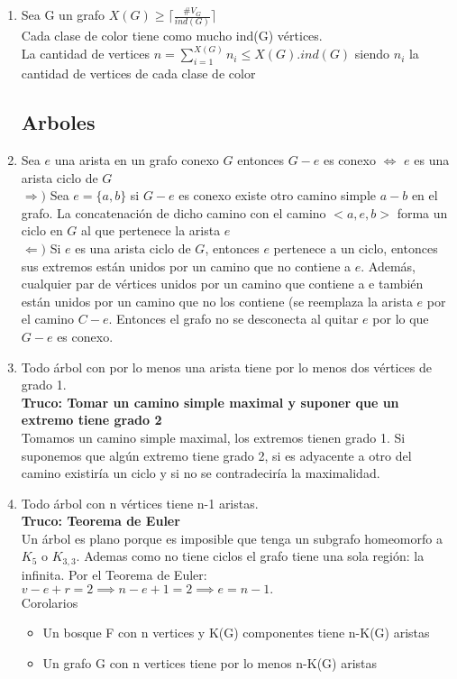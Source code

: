 \documentclass{article}
\begin{document}
\begin{enumerate}
    \item Sea G un grafo $X(G) \geq \lceil\frac{\#V_G}{ind(G)}\rceil$ \\
    Cada clase de color tiene como mucho ind(G) vértices.\\
    La cantidad de vertices $n=\sum_{i=1}^{X(G)}n_i\leq X(G).ind(G)$ siendo $n_i$ la cantidad de vertices de cada clase de color

\subsection{Arboles}
    \item Sea $e$ una arista en un grafo conexo $G$ entonces $G-e$ es conexo $\iff$ $e$ es una arista ciclo de $G$ \\
        $\Rightarrow)$ Sea $e = \{a,b\}$ si $G-e$ es conexo existe otro camino simple $a-b$ en el
        grafo. La concatenación de dicho camino con el camino $<a,e,b>$ forma un
        ciclo en $G$ al que pertenece la arista $e$ \\
        $\Leftarrow)$ Si $e$ es una arista ciclo de $G$, entonces $e$ pertenece a un ciclo, entonces sus
        extremos están unidos por un camino que no contiene a $e$. Además, cualquier
        par de vértices unidos por un camino que contiene a e también están unidos
        por un camino que no los contiene (se reemplaza la arista $e$ por el camino
        $C-e$. Entonces el grafo no se desconecta al quitar $e$ por lo que $G-e$ es
        conexo.
    
    \item Todo árbol con por lo menos una arista tiene por lo menos dos vértices de grado 1. \\
    \textbf{Truco: Tomar un camino simple maximal y suponer que un extremo tiene grado 2} \\
    Tomamos un camino simple maximal, los extremos tienen grado 1. Si suponemos que algún extremo tiene grado 2, si es adyacente a otro del camino existiría un ciclo y si no se contradeciría la maximalidad. 
    
    \item Todo árbol con n vértices tiene n-1 aristas. \\
    \textbf{Truco: Teorema de Euler} \\
    Un árbol es plano porque es imposible que tenga un subgrafo homeomorfo a $K_5$ o $K_{3,3}$. Ademas como no tiene ciclos el grafo tiene una sola región: la infinita. Por el Teorema de Euler: $v - e + r =2 \implies n - e + 1 = 2 \implies e = n - 1.$ \\
    Corolarios 
    \begin{itemize}
        \item Un bosque F con n vertices y K(G) componentes tiene n-K(G) aristas
        \item Un grafo G con n vertices tiene por lo menos n-K(G) aristas
    \end{itemize}
    

\end{enumerate}
\end{document}
